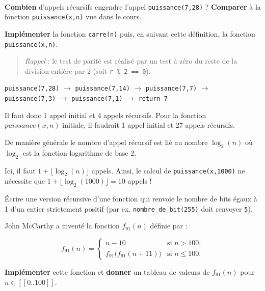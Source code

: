 \documentclass[a4paper,17pt]{extarticle}
\newenvironment{eleve}%
{\begin{activite}\color{noiramu}\\[-0.5cm]}
{\end{activite}}
\begin{document}
\begin{eleve}
\textbf{Combien} d'appels récursifs engendre l'appel
\texttt{puissance(7,28)} ? \textbf{Comparer} à la fonction
\texttt{puissance(x,n)} vue dans le cours.

\textbf{Implémenter} la fonction \texttt{carre(n)} puis, en suivant
cette définition, la fonction \texttt{puissance(x,n)}.

\begin{quote}
\emph{Rappel} : le test de parité est réalisé par un test à zéro du
reste de la division entière par 2 (soit \texttt{r\ \%\ 2\ ==\ 0}).
\end{quote}
        
        \end{eleve}\begin{reponse}
    \texttt{puissance(7,28)} \(\rightarrow\) \texttt{puissance(7,14)}
\(\rightarrow\) \texttt{puissance(7,7)} \(\rightarrow\)
\texttt{puissance(7,3)} \(\rightarrow\) \texttt{puissance(7,1)}
\(\rightarrow\) \texttt{return\ 7}

Il faut donc 1 appel initial et 4 appels récursifs. Pour la fonction
\(puissance(x,n)\) initiale, il faudrait 1 appel initial et 27 appels
récursifs.

De manière générale le nombre d'appel récursif est lié au nombre
\(\log_2 (n)\) où \(\log_2\) est la fonction logarithme de base 2.

Ici, il faut \(1+\lfloor \log_2(n) \rfloor\) appels. Ainsi, le calcul de
\texttt{puissance(x,1000)} ne nécessite que
\(1+\lfloor \log_2 (1000) \rfloor = 10\) appels !

            \end{reponse}\begin{retenir}
    Écrire une version récursive d'une fonction qui renvoie le nombre de
bits égaux à 1 d'un entier strictement positif (par ex.
\texttt{nombre\_de\_bit(255)} doit renvoyer \texttt{5}).

            \end{retenir}\begin{retenir}
    John McCarthy a inventé la fonction \(f_{91}(n)\) définie par :

\[
f_{91}(n) = \left\{
\begin{array}{ll}
    n-10 &\text{si $n>100$}, \\
    f_{91} \big( f_{91} (n + 11) \big ) &\text{si $n \leq 100$}.
\end{array}
\right.
\]

\textbf{Implémenter} cette fonction et \textbf{donner} un tableau de
valeurs de \(f_{91}(n)\) pour \(n \in [\![0..100]\!]\).

            \end{retenir}

    
    
    
\end{document}
